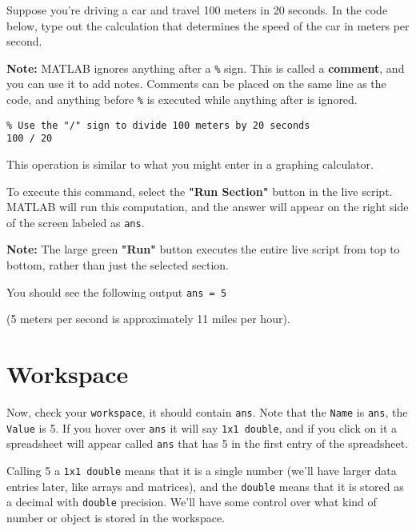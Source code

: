 \documentclass{ximera}
\begin{document}
\begin{example}
Suppose you're driving a car and travel 100 meters in 20 seconds.
In the code below, type out the calculation that determines the speed of the car in meters per second.

\begin{remark}
\textbf{Note:} MATLAB ignores anything after a \texttt{\%} sign. This is called a \textbf{comment}, and you can use it to add notes. 
Comments can be placed on the same line as the code, and anything before \texttt{\%} is executed while anything after is ignored.
\end{remark}

\begin{verbatim}
% Use the "/" sign to divide 100 meters by 20 seconds
100 / 20
\end{verbatim}

This operation is similar to what you might enter in a graphing calculator.

To execute this command, select the \textbf{"Run Section"} button in the live script. MATLAB will run this computation, 
and the answer will appear on the right side of the screen labeled as \texttt{ans}.

\begin{remark}
\textbf{Note:} The large green \textbf{"Run"} button executes the entire live script from top to bottom, rather than just the selected section.
\end{remark}

You should see the following output \texttt{ans = 5}

(5 meters per second is approximately 11 miles per hour).
\end{example}

\section*{Workspace}
Now, check your \texttt{workspace}, it should contain \texttt{ans}. Note that the \texttt{Name} is \texttt{ans}, the \texttt{Value} is 5. If you hover over \texttt{ans} it will say \texttt{1x1 double}, and if you click on it a spreadsheet will appear called \texttt{ans} that has 5 in the first entry of the spreadsheet.

Calling 5 a \texttt{1x1 double} means that it is a single number (we'll have larger data entries later, like arrays and matrices), and the \texttt{double} means that it is stored as a decimal with \texttt{double} precision. We'll have some control over what kind of number or object is stored in the workspace.
\end{document}
